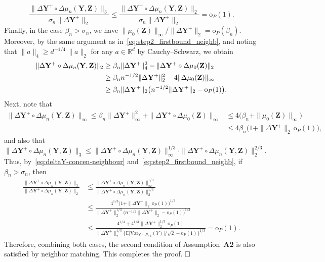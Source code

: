 \documentclass[12pt]{article}
\newcommand{\R}{\mathbb{R}}
\newcommand{\bY}{\mathbf{Y}}
\newcommand{\bZ}{\mathbf{Z}}
\begin{document}
    \[
    \frac{\|\Delta\bY^+\circ \Delta\mu_n(\bY,\bZ)\|_3}{\sigma_n \|\Delta\bY^+\|_2} \leq \frac{\|\Delta\bY^+\circ \Delta\mu_n(\bY,\bZ)\|_2}{\sigma_n \|\Delta\bY^+\|_2}=\mathrm{o}_P(1). 
    \]
    Finally, in the case $\beta_n > \sigma_n$, we have $\|\mu_0(\bZ)\|_\infty/\|\Delta\bY^+\|_2 =\mathrm{o}_P(\beta_n)$. Moreover, by the same argument as in~\eqref{eq:step2_firstbound_neighb}, and noting that $\|a\|_4\ge d^{-1/4}\,\|a\|_2$ for any $a\in \R^d$ by Cauchy--Schwarz, we obtain 
    \begin{align}
        \notag\|\Delta\bY^+\circ \Delta\mu_n(\bY,\bZ)\|_2 & \geq \beta_n \|\Delta\bY^+\|_4^2-\|\Delta\bY^+\circ \Delta\mu_0(\bZ)\|_2\\
        \notag&\ge \beta_n n^{-1/2} \|\Delta\bY^+\|_2^2-4 \|\Delta\mu_0(\bZ)\|_\infty \\
        &\geq  \beta_n\|\Delta\bY^+\|_2 \bigl( n^{-1/2} \|\Delta\bY^+\|_2-\mathrm{o}_P(1)\bigr).
    \end{align}
    Next, note that 
    \begin{align*}
        \|\Delta\bY^+\circ \Delta\mu_n(\bY,\bZ)\|_\infty\leq \beta_n \|\Delta\bY^+\|_\infty^2+\|\Delta\bY^+\circ \Delta\mu_0(\bZ)\|_\infty 
        &\leq 4\bigl(\beta_n+ \|\mu_0(\bZ)\|_\infty\bigr)\\
        & \leq 4\beta_n\bigl(1+ \|\Delta\bY^+\|_2\,\mathrm{o}_P(1)\bigr),
    \end{align*}
    and also that
    \[
    \|\Delta\bY^+\circ \Delta\mu_n(\bY,\bZ)\|_3\leq \|\Delta\bY^+\circ \Delta\mu_n(\bY,\bZ)\|_\infty^{1/3}\cdot \|\Delta\bY^+\circ \Delta\mu_n(\bY,\bZ)\|_2^{2/3}.
    \]
    Thus, by~\eqref{eq:deltaY-concen-neighbour} and~\eqref{eq:step2_firstbound_neighb}, if $\beta_n > \sigma_n$, then   
   \begin{align*}
    \frac{\|\Delta\bY^+\circ \Delta\mu_n(\bY,\bZ)\|_3}{\|\Delta\bY^+\circ \Delta\mu_n(\bY,\bZ)\|_2}&\le \frac{\|\Delta\bY^+\circ \Delta\mu_n(\bY,\bZ)\|_\infty^{1/3}}{\|\Delta\bY^+\circ \Delta\mu_n(\bY,\bZ)\|_2^{1/3}} \\&\le \frac{4^{1/3}\bigl( 1+\|\Delta\bY^+\|_2\,\mathrm{o}_P(1)\bigr)^{1/3}}{\|\Delta\bY^+\|_2^{1/3} \bigl(n^{-1/2} \|\Delta\bY^+\|_2-\mathrm{o}_P(1)\bigr)^{1/3}} \\
    &\leq \frac{4^{1/3} + 4^{1/3}\|\Delta\bY^+\|_2^{1/3}\,\mathrm{o}_P(1)}{\|\Delta\bY^+\|_2^{1/3}\bigl\{\mathbb{E}\bigl[\mathrm{Var}_{Y \sim P_{Y|Z}}(Y)\bigr]/\sqrt{2} -\mathrm{o}_P(1)\bigr\}^{1/3}}
    = \mathrm{o}_P(1).
    \end{align*}
    Therefore, combining both cases, the second condition of Assumption~\textbf{A2} is also satisfied by neighbor matching. This completes the proof. $\hfill{\square}$
\end{document}
